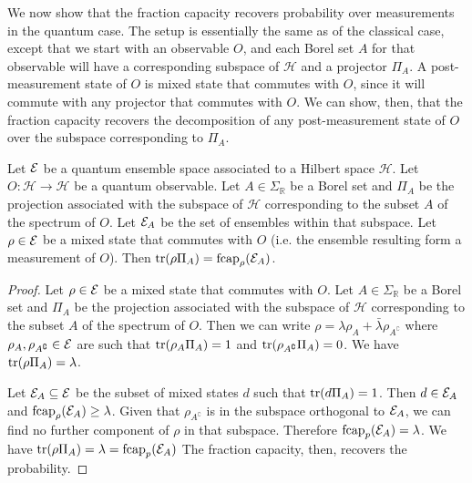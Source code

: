 We now show that the fraction capacity recovers probability over measurements in the quantum case. The setup is essentially the same as of the classical case, except that we start with an observable $O$, and each Borel set $A$ for that observable will have a corresponding subspace of $\mathcal{H}$ and a projector $\Pi_A$. A post-measurement state of $O$ is mixed state that commutes with $O$, since it will commute with any projector that commutes with $O$. We can show, then, that the fraction capacity recovers the decomposition of any post-measurement state of $O$ over the subspace corresponding to $\Pi_A$.

\begin{mathSection}
	\begin{prop}
		Let $\mathcal{E}$ be a quantum ensemble space associated to a Hilbert space $\mathcal{H}$. Let $O : \mathcal{H} \to \mathcal{H}$ be a quantum observable. Let $A \in \Sigma_{\mathbb{R}}$ be a Borel set and $\Pi_{A}$ be the projection associated with the subspace of $\mathcal{H}$ corresponding to the subset $A$ of the spectrum of $O$. Let $\mathcal{E}_A$ be the set of ensembles within that subspace. Let $\rho \in \mathcal{E}$ be a mixed state that commutes with $O$ (i.e. the ensemble resulting form a measurement of $O$). Then $\operatorname{tr}(\rho \Pi_A) = \mathrm{fcap}_{\rho}(\mathcal{E}_A)$.
	\end{prop}
	
	\begin{proof}
		Let $\rho \in \mathcal{E}$ be a mixed state that commutes with $O$. Let $A \in \Sigma_{\mathbb{R}}$ be a Borel set and $\Pi_{A}$ be the projection associated with the subspace of $\mathcal{H}$ corresponding to the subset $A$ of the spectrum of $O$. Then we can write $\rho = \lambda \rho_A + \bar{\lambda} \rho_{A^{\complement}}$ where $\rho_A, \rho_{A^{\complement}} \in \mathcal{E}$ are such that $\operatorname{tr}(\rho_A \Pi_A) = 1$ and  $\operatorname{tr}(\rho_{A^{\complement}} \Pi_A) = 0$. We have $\operatorname{tr}(\rho \Pi_A) = \lambda$.
		
		Let $\mathcal{E}_A \subseteq \mathcal{E}$ be the subset of mixed states $d$ such that $\operatorname{tr}(d \Pi_A) = 1$. Then $d \in \mathcal{E}_A$ and $\mathrm{fcap}_{\rho}(\mathcal{E}_A) \geq \lambda$. Given that $\rho_{A^{\complement}}$ is in the subspace orthogonal to $\mathcal{E}_A$, we can find no further component of $\rho$ in that subspace. Therefore $\mathrm{fcap}_{p}(\mathcal{E}_A) = \lambda$. We have $\operatorname{tr}(\rho \Pi_A) = \lambda = \mathrm{fcap}_{p}(\mathcal{E}_A)$ The fraction capacity, then, recovers the probability.
	\end{proof}
\end{mathSection}

